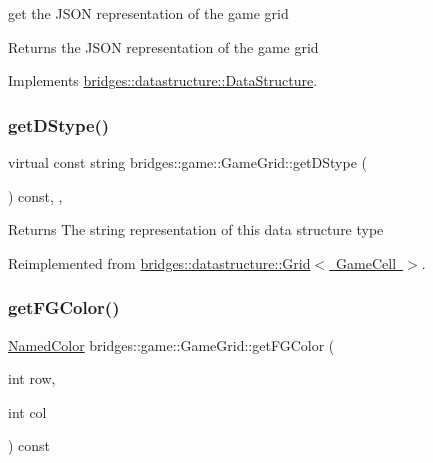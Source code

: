 get the J\+S\+ON representation of the game grid

\begin{DoxyReturn}{Returns}
the J\+S\+ON representation of the game grid 
\end{DoxyReturn}


Implements \mbox{\hyperlink{classbridges_1_1datastructure_1_1_data_structure}{bridges\+::datastructure\+::\+Data\+Structure}}.

\mbox{\label{classbridges_1_1game_1_1_game_grid_a07da19700a077e3d0f2cde2cade2ba60}} 
\subsubsection{\texorpdfstring{get\+D\+Stype()}{getDStype()}}
{\footnotesize\ttfamily virtual const string bridges\+::game\+::\+Game\+Grid\+::get\+D\+Stype (\begin{DoxyParamCaption}{ }\end{DoxyParamCaption}) const\hspace{0.3cm}{\ttfamily [inline]}, {\ttfamily [override]}, {\ttfamily [virtual]}}

\begin{DoxyReturn}{Returns}
The string representation of this data structure type 
\end{DoxyReturn}


Reimplemented from \mbox{\hyperlink{classbridges_1_1datastructure_1_1_grid_a16aeae38446b96f440dea15f2b19334d}{bridges\+::datastructure\+::\+Grid$<$ Game\+Cell $>$}}.

\mbox{\label{classbridges_1_1game_1_1_game_grid_a6d38c8ac0d4ccbdd1b2b1c5d2f445d9a}} 
\subsubsection{\texorpdfstring{get\+F\+G\+Color()}{getFGColor()}}
{\footnotesize\ttfamily \mbox{\hyperlink{namespacebridges_1_1game_afaa832a4322b25b6a4ebfba832f10f26}{Named\+Color}} bridges\+::game\+::\+Game\+Grid\+::get\+F\+G\+Color (\begin{DoxyParamCaption}\item[{int}]{row,  }\item[{int}]{col }\end{DoxyParamCaption}) const\hspace{0.3cm}{\ttfamily [inline]}}

